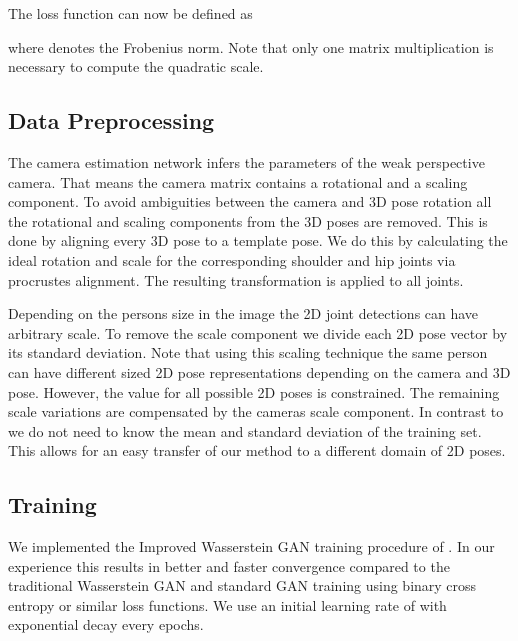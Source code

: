 \documentclass[10pt,twocolumn,letterpaper]{article}
\begin{document}
The loss function can now be defined as 

where  denotes the Frobenius norm.
Note that only one matrix multiplication is necessary to compute the quadratic scale.

\subsection{Data Preprocessing}
The camera estimation network infers the parameters of the weak perspective camera.
That means the camera matrix contains a rotational and a scaling component.
To avoid ambiguities between the camera and 3D pose rotation all the rotational and scaling components from the 3D poses are removed.
This is done by aligning every 3D pose to a template pose.
We do this by calculating the ideal rotation and scale for the corresponding shoulder and hip joints via procrustes alignment.
The resulting transformation is applied to all joints.

Depending on the persons size in the image the 2D joint detections can have arbitrary scale.
To remove the scale component we divide each 2D pose vector by its standard deviation.
Note that using this scaling technique the same person can have different sized 2D pose representations depending on the camera and 3D pose.
However, the value for all possible 2D poses is constrained.
The remaining scale variations are compensated by the cameras scale component.
In contrast to \eg \cite{martinez_2017_3dbaseline} we do not need to know the mean and standard deviation of the training set.
This allows for an easy transfer of our method to a different domain of 2D poses.

\subsection{Training}
We implemented the Improved Wasserstein GAN training procedure of \cite{iwgan2017}. 
In our experience this results in better and faster convergence compared to the traditional Wasserstein GAN \cite{wgan2017} and standard GAN training \cite{Goodfellow2014} using binary cross entropy or similar loss functions.
We use an initial learning rate of  with exponential decay every  epochs.
\end{document}
